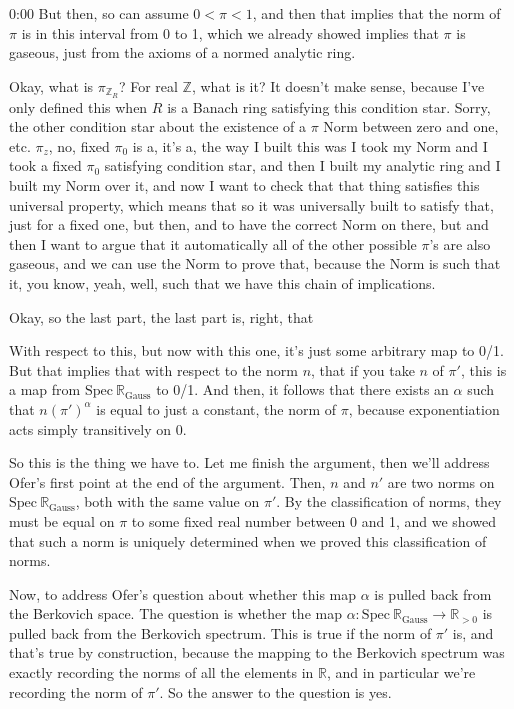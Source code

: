 \begin{unfinished}{0:00}
But then, so can assume $0 < \pi < 1$, and then that implies that the norm of $\pi$ is in this interval from 0 to 1, which we already showed implies that $\pi$ is gaseous, just from the axioms of a normed analytic ring.

Okay, what is $\pi_{\mathbb{Z}_R}$? For real $\mathbb{Z}$, what is it? It doesn't make sense, because I've only defined this when $R$ is a Banach ring satisfying this condition star. Sorry, the other condition star about the existence of a $\pi$ Norm between zero and one, etc. $\pi_z$, no, fixed $\pi_0$ is a, it's a, the way I built this was I took my Norm and I took a fixed $\pi_0$ satisfying condition star, and then I built my analytic ring and I built my Norm over it, and now I want to check that that thing satisfies this universal property, which means that so it was universally built to satisfy that, just for a fixed one, but then, and to have the correct Norm on there, but and then I want to argue that it automatically all of the other possible $\pi$'s are also gaseous, and we can use the Norm to prove that, because the Norm is such that it, you know, yeah, well, such that we have this chain of implications.

Okay, so the last part, the last part is, right, that

With respect to this, but now with this one, it's just some arbitrary map to 0/1. But that implies that with respect to the norm $n$, that if you take $n$ of $\pi'$, this is a map from $\mathrm{Spec}\ \mathbb{R}_{\text{Gauss}}$ to 0/1. And then, it follows that there exists an $\alpha$ such that $n(\pi')^{\alpha}$ is equal to just a constant, the norm of $\pi$, because exponentiation acts simply transitively on 0.

So this is the thing we have to. Let me finish the argument, then we'll address Ofer's first point at the end of the argument. Then, $n$ and $n'$ are two norms on $\mathrm{Spec}\ \mathbb{R}_{\text{Gauss}}$, both with the same value on $\pi'$. By the classification of norms, they must be equal on $\pi$ to some fixed real number between 0 and 1, and we showed that such a norm is uniquely determined when we proved this classification of norms.

Now, to address Ofer's question about whether this map $\alpha$ is pulled back from the Berkovich space. The question is whether the map $\alpha: \mathrm{Spec}\ \mathbb{R}_{\text{Gauss}} \to \mathbb{R}_{>0}$ is pulled back from the Berkovich spectrum. This is true if the norm of $\pi'$ is, and that's true by construction, because the mapping to the Berkovich spectrum was exactly recording the norms of all the elements in $\mathbb{R}$, and in particular we're recording the norm of $\pi'$. So the answer to the question is yes.


\end{unfinished}
